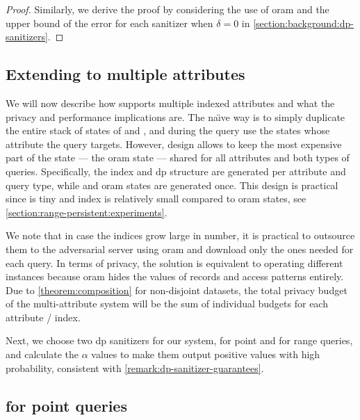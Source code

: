 		\begin{proof}
			Similarly, we derive the proof by considering the use of \acrshort{oram} and the upper bound of the error for each sanitizer when $\delta = 0$ in \cref{section:background:dp-sanitizers}.
		\end{proof}

	\subsection{Extending to multiple attributes}\label{section:range-persistent:dp-oram:multiple-attributes}

		We will now describe how \epsolute{} supports multiple indexed attributes and what the privacy and performance implications are.
		The na\"{\i}ve way is to simply duplicate the entire stack of states of \user{} and \server{}, and during the query use the states whose attribute the query targets.
		However, \epsolute{} design allows to keep the most expensive part of the state --- the \acrshort{oram} state --- shared for all attributes and both types of queries.
		Specifically, the index \indexI{} and \acrshort{dp} structure \serverDS{} are generated per attribute and query type, while \user{} and \server{} \acrshort{oram} states are generated once.
		This design is practical since \serverDS{} is tiny and index \indexI{} is relatively small compared to \acrshort{oram} states, see \cref{section:range-persistent:experiments}.

		We note that in case the indices grow large in number, it is practical to outsource them to the adversarial server using \acrshort{oram} and download only the ones needed for each query.
		In terms of privacy, the solution is equivalent to operating different \epsolute{} instances because \acrshort{oram} hides the values of records and access patterns entirely.
		Due to \cref{theorem:composition} for non-disjoint datasets, the total privacy budget of the multi-attribute system will be the sum of individual budgets for each attribute / index.

		Next, we choose two \acrshort{dp} sanitizers for our system, for point and for range queries, and calculate the $\alpha$ values to make them output positive values with high probability, consistent with \cref{remark:dp-sanitizer-guarantees}.

	\subsection{\texorpdfstring{\epsolute{}}{Epsolute} for point queries}\label{section:range-persistent:dp-oram:point}

